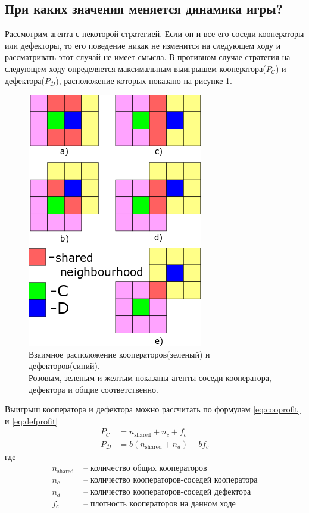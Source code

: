 \documentclass[12pt]{article}
\begin{document}
    \subsection{При каких значения меняется динамика игры?}
        Рассмотрим агента с некоторой стратегией. Если он и все его соседи кооператоры или дефекторы, то его поведение никак не изменится на следующем ходу и рассматривать этот случай не имеет смысла. В противном случае стратегия на следующем ходу определяется максимальным выигрышем кооператора($P_{\mathcal{C}}$) и дефектора($P_{\mathcal{D}}$), расположение которых показано на рисунке \ref{fig:neigh}.
        \begin{figure}[h!]
            \centering
            \captionsetup{justification=centering}
            \includegraphics[scale=.5]{neighbourhoods.png}
            \caption{\small Взаимное расположение кооператоров(зеленый) и дефекторов(синий).\\
            Розовым, зеленым и желтым показаны агенты-соседи кооператора, дефектора и общие соответственно.}
            \label{fig:neigh}
        \end{figure}

    Выигрыш кооператора и дефектора можно рассчитать по формулам \eqref{eq:cooprofit} и \eqref{eq:defprofit}
    \begin{align}
        P_{\mathcal{C}}& = n_\mathrm{shared} + n_c + f_c\label{eq:cooprofit}\\
        P_{\mathcal{D}}& = b(n_\mathrm{shared} + n_d) + bf_c\label{eq:defprofit}
    \end{align}
    где
    \begin{align*}
        n_\mathrm{shared}&\text{ -- количество общих кооператоров}\\
        n_c&\text{ -- количество кооператоров-соседей кооператора}\\
        n_d&\text{ -- количество кооператоров-соседей дефектора}\\ f_c&\text{ -- плотность кооператоров на данном ходе}
    \end{align*}
\end{document}
